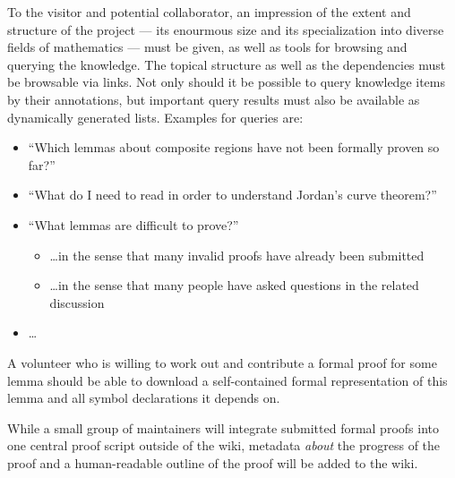 \documentclass{llncs}
\begin{document}
To the visitor and potential collaborator, an impression of the extent and structure of
the project --- its enourmous size and its specialization into diverse fields of
mathematics --- must be given, as well as tools for browsing and querying the knowledge.
The topical structure as well as the dependencies must be browsable via links.  Not only
should it be possible to query knowledge items by their annotations, but important query
results must also be available as dynamically generated lists.  Examples for queries are:

\begin{itemize}
\item ``Which lemmas about composite regions have not been formally proven so far?''
\item ``What do I need to read in order to understand Jordan's curve
  theorem?''
\item ``What lemmas are difficult to prove?''
  \begin{itemize}
  \item \ldots in the sense that many invalid proofs have already been submitted
  \item \ldots in the sense that many people have asked questions in the related discussion
  \end{itemize}
\item \ldots{}
\end{itemize}

A volunteer who is willing to work out and contribute a formal proof for some lemma should
be able to download a self-contained formal representation of this lemma and all symbol
declarations it depends on.

While a small group of maintainers will integrate submitted formal proofs into one central
proof script outside of the wiki, metadata \emph{about} the progress
of the proof and a human-readable outline of the proof will
be added to the wiki.
\end{document}
